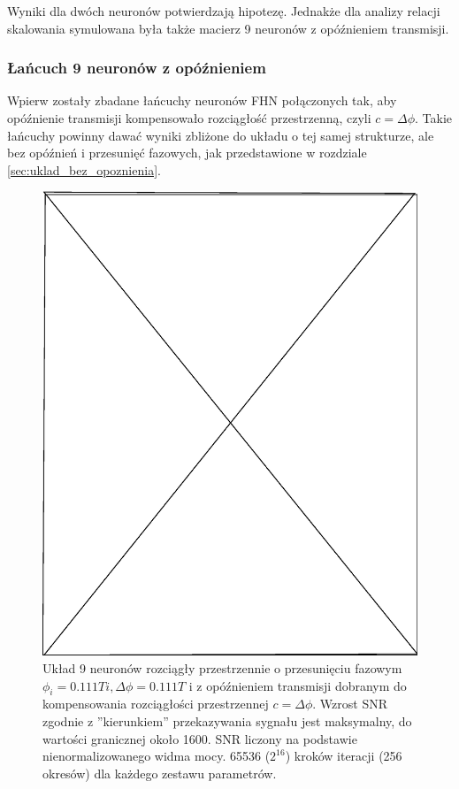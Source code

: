   Wyniki dla dwóch neuronów potwierdzają hipotezę. Jednakże dla analizy relacji skalowania symulowana była także macierz 9 neuronów z opóźnieniem transmisji.

  \subsubsection{Łańcuch 9 neuronów z opóźnieniem}


  Wpierw zostały zbadane łańcuchy neuronów FHN połączonych tak, aby opóźnienie transmisji kompensowało rozciągłość przestrzenną, czyli $c = \Delta \phi$. Takie łańcuchy powinny dawać wyniki zbliżone do układu o tej samej strukturze, ale bez opóźnień i przesunięć fazowych, jak przedstawione w rozdziale \ref{sec:uklad_bez_opoznienia}.
    

  \begin{figure}
    \includegraphics[width=140mm]{images/pending}
    \caption{Układ 9 neuronów rozciągły przestrzennie o przesunięciu fazowym $\phi_i = 0.111 T i, \Delta \phi = 0.111 T$ i z opóźnieniem transmisji dobranym do kompensowania rozciągłości przestrzennej $c = \Delta \phi$. Wzrost SNR zgodnie z ''kierunkiem'' przekazywania sygnału jest maksymalny, do wartości granicznej około 1600. SNR liczony na podstawie nienormalizowanego widma mocy. 65536 ($2^{16}$) kroków iteracji (256 okresów) dla każdego zestawu parametrów.}
    \label{fig:graphics:sim:2010_10_03}
  \end{figure}

